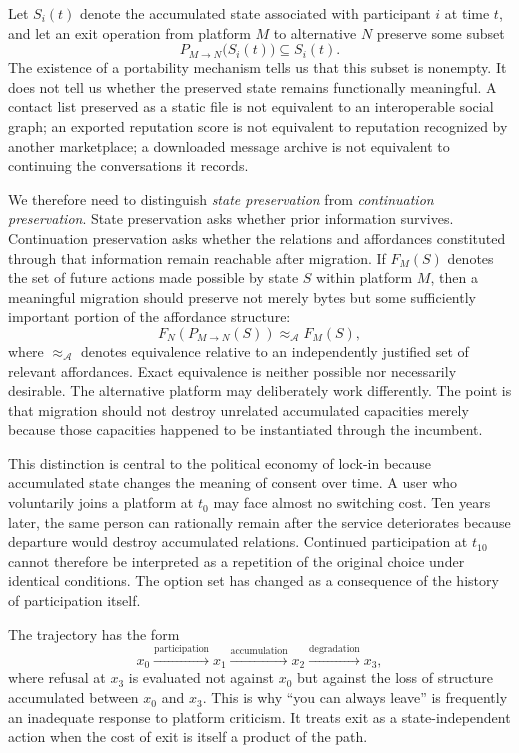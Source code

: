 \documentclass[11pt]{article}
\begin{document}
Let \(S_i(t)\) denote the accumulated state associated with participant \(i\) at time \(t\), and let an exit operation from platform \(M\) to alternative \(N\) preserve some subset
\[
P_{M\rightarrow N}\bigl(S_i(t)\bigr)
\subseteq
S_i(t).
\]
The existence of a portability mechanism tells us that this subset is nonempty. It does not tell us whether the preserved state remains functionally meaningful. A contact list preserved as a static file is not equivalent to an interoperable social graph; an exported reputation score is not equivalent to reputation recognized by another marketplace; a downloaded message archive is not equivalent to continuing the conversations it records.

We therefore need to distinguish \emph{state preservation} from \emph{continuation preservation}. State preservation asks whether prior information survives. Continuation preservation asks whether the relations and affordances constituted through that information remain reachable after migration. If \(F_M(S)\) denotes the set of future actions made possible by state \(S\) within platform \(M\), then a meaningful migration should preserve not merely bytes but some sufficiently important portion of the affordance structure:
\[
F_N\!\left(P_{M\rightarrow N}(S)\right)
\approx_{\mathcal{A}}
F_M(S),
\]
where \(\approx_{\mathcal{A}}\) denotes equivalence relative to an independently justified set of relevant affordances. Exact equivalence is neither possible nor necessarily desirable. The alternative platform may deliberately work differently. The point is that migration should not destroy unrelated accumulated capacities merely because those capacities happened to be instantiated through the incumbent.

This distinction is central to the political economy of lock-in because accumulated state changes the meaning of consent over time. A user who voluntarily joins a platform at \(t_0\) may face almost no switching cost. Ten years later, the same person can rationally remain after the service deteriorates because departure would destroy accumulated relations. Continued participation at \(t_{10}\) cannot therefore be interpreted as a repetition of the original choice under identical conditions. The option set has changed as a consequence of the history of participation itself.

The trajectory has the form
\[
x_0
\xrightarrow{\text{participation}}
x_1
\xrightarrow{\text{accumulation}}
x_2
\xrightarrow{\text{degradation}}
x_3,
\]
where refusal at \(x_3\) is evaluated not against \(x_0\) but against the loss of structure accumulated between \(x_0\) and \(x_3\). This is why ``you can always leave'' is frequently an inadequate response to platform criticism. It treats exit as a state-independent action when the cost of exit is itself a product of the path.
\end{document}

